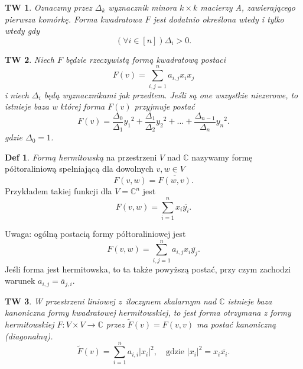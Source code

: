 \documentclass[a4paper, 12pt]{mwart}
\theoremstyle{definition}
\newtheorem{definicja}{Def}[section]
\theoremstyle{plain}
\newtheorem{twierdzenie}{TW}[section]
\theoremstyle{remark}
\begin{document}
\begin{twierdzenie}
	Oznaczmy przez $\Delta_k$ wyznacznik minora $k\times k$ macierzy A, zawierającego pierwsza komórkę. Forma kwadratowa $F$ jest dodatnio określona wtedy i tylko wtedy gdy
	\begin{equation}
		\left(\forall i \in [n] \right) \Delta_i > 0.
	\end{equation}
\end{twierdzenie}
\begin{twierdzenie}
	Niech $F$ będzie rzeczywistą formą kwadratową postaci
	\begin{equation}
		F(v) = \sum_{i, j = 1}^{n} a_{i, j}x_ix_j
	\end{equation}
	i niech $\Delta_i$ będą wyznacznikami jak przedtem. Jeśli są one wszystkie niezerowe, to istnieje baza w której forma $F(v)$ przyjmuje postać
	\begin{equation}
		F(v) = \frac{\Delta_0}{\Delta_1}{y_1}^2 + \frac{\Delta_1}{\Delta_2}{y_2}^2 + \ldots + \frac{\Delta_{n-1}}{\Delta_n}{y_n}^2.
	\end{equation}
	gdzie $\Delta_0 = 1$.
\end{twierdzenie}
\begin{definicja}
	\emph{Formą hermitowską} na przestrzeni $V$ nad $\mathbb{C}$ nazywamy formę półtoraliniową spełniającą dla dowolnych $v, w \in V$
	\begin{equation}
		F(v, w) = \overline {F(w, v)}.
	\end{equation}
	Przykładem takiej funkcji dla $V = {\mathbb{C}}^n$ jest
	\begin{equation}
		F(v, w) = \sum_{i = 1}^n x_i\overline{y_i}.
	\end{equation}
\end{definicja}
Uwaga: ogólną postacią formy półtoraliniowej jest
\begin{equation}
	F(v, w) = \sum_{i, j = 1}^n a_{i, j}x_i\overline{y_j}.
\end{equation}
Jeśli forma jest hermitowska, to ta także powyższą postać, przy czym zachodzi warunek $a_{i, j} = \overline a_{j, i}$.
\begin{twierdzenie}
	W przestrzeni liniowej z~iloczynem skalarnym nad $\mathbb{C}$ istnieje baza kanoniczna formy kwadratowej hermitowskiej, to jest forma otrzymana z formy hermitowskiej $F\colon V\times V\to \mathbb{C}$ przez $\widetilde{F}(v) = F(v, v)$ ma postać kanoniczną (diagonalną).
	\begin{equation}
		\widetilde F(v) = \sum_{i = 1}^n a_{i, i}{|x_i|}^2, \quad \text{gdzie ${|x_i|}^2 = x_i\overline{x_i}$.}
	\end{equation}
\end{twierdzenie}
\end{document}

